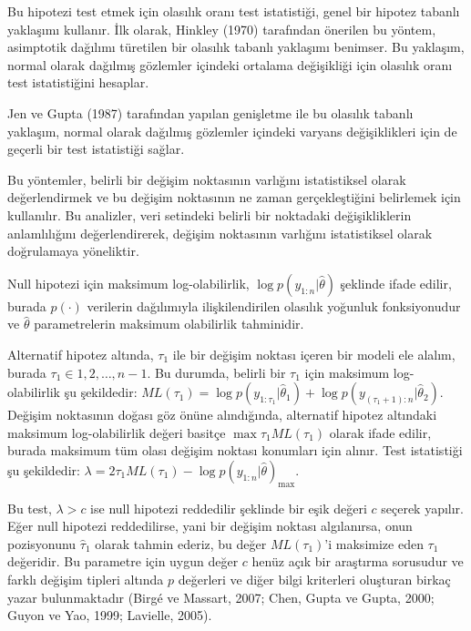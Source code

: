 \documentclass[12pt,twoside]{deuthesis}
\begin{document}
Bu hipotezi test etmek için olasılık oranı test istatistiği, genel bir hipotez tabanlı yaklaşımı kullanır. İlk olarak, Hinkley (1970) tarafından önerilen bu yöntem, asimptotik dağılımı türetilen bir olasılık tabanlı yaklaşımı benimser. Bu yaklaşım, normal olarak dağılmış gözlemler içindeki ortalama değişikliği için olasılık oranı test istatistiğini hesaplar.

Jen ve Gupta (1987) tarafından yapılan genişletme ile bu olasılık tabanlı yaklaşım, normal olarak dağılmış gözlemler içindeki varyans değişiklikleri için de geçerli bir test istatistiği sağlar.

Bu yöntemler, belirli bir değişim noktasının varlığını istatistiksel olarak değerlendirmek ve bu değişim noktasının ne zaman gerçekleştiğini belirlemek için kullanılır. Bu analizler, veri setindeki belirli bir noktadaki değişikliklerin anlamlılığını değerlendirerek, değişim noktasının varlığını istatistiksel olarak doğrulamaya yöneliktir.

Null hipotezi için maksimum log-olabilirlik, \(\log p(y_{1:n}|\hat{\theta})\) şeklinde ifade edilir, burada \(p(\cdot)\) verilerin dağılımıyla ilişkilendirilen olasılık yoğunluk fonksiyonudur ve \(\hat{\theta}\) parametrelerin maksimum olabilirlik tahminidir.

Alternatif hipotez altında, \(\tau_1\) ile bir değişim noktası içeren bir modeli ele alalım, burada \(\tau_1 \in {1, 2, \dots, n - 1}\). Bu durumda, belirli bir \(\tau_1\) için maksimum log-olabilirlik şu şekildedir: \(ML(\tau_1) = \log p(y_{1:\tau_1}|\hat{\theta}_1) + \log p(y_{(\tau_1+1):n}|\hat{\theta}_2)\). Değişim noktasının doğası göz önüne alındığında, alternatif hipotez altındaki maksimum log-olabilirlik değeri basitçe \(\max{\tau_1} ML(\tau_1)\) olarak ifade edilir, burada maksimum tüm olası değişim noktası konumları için alınır. Test istatistiği şu şekildedir: \(\lambda = 2\tau_1 ML(\tau_1) - \log p(y_{1:n}|\hat{\theta})_{\max}\).

Bu test, \(\lambda > c\) ise null hipotezi reddedilir şeklinde bir eşik değeri \(c\) seçerek yapılır. Eğer null hipotezi reddedilirse, yani bir değişim noktası algılanırsa, onun pozisyonunu \(\hat{\tau}_1\) olarak tahmin ederiz, bu değer \(ML(\tau_1)\)'i maksimize eden \(\tau_1\) değeridir. Bu parametre için uygun değer \(c\) henüz açık bir araştırma sorusudur ve farklı değişim tipleri altında \(p\) değerleri ve diğer bilgi kriterleri oluşturan birkaç yazar bulunmaktadır (Birgé ve Massart, 2007; Chen, Gupta ve Gupta, 2000; Guyon ve Yao, 1999; Lavielle, 2005).
\end{document}
